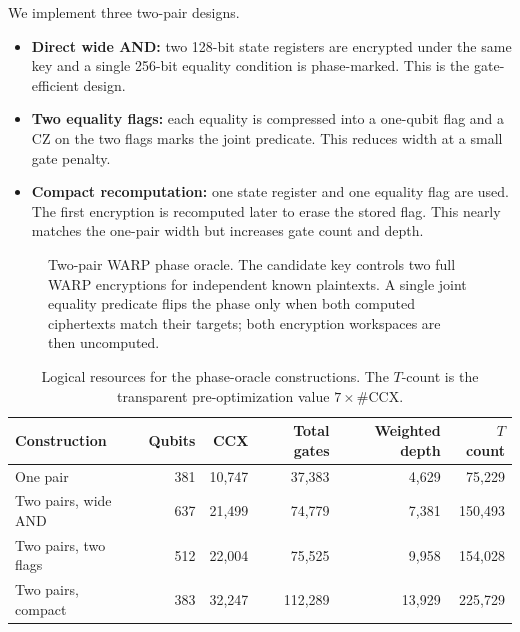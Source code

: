\documentclass[10pt,a4paper]{article}
\providecommand{\ket}[1]{\lvert #1\rangle}
\begin{document}
We implement three two-pair designs.
\begin{itemize}
    \item \textbf{Direct wide AND:} two 128-bit state registers are encrypted under the same key and a single 256-bit equality condition is phase-marked. This is the gate-efficient design.
    \item \textbf{Two equality flags:} each equality is compressed into a one-qubit flag and a CZ on the two flags marks the joint predicate. This reduces width at a small gate penalty.
    \item \textbf{Compact recomputation:} one state register and one equality flag are used. The first encryption is recomputed later to erase the stored flag. This nearly matches the one-pair width but increases gate count and depth.
\end{itemize}

\begin{figure}[tbp]
\centering
{}
\caption{Two-pair WARP phase oracle. The candidate key controls two full WARP encryptions for independent known plaintexts. A single joint equality predicate flips the phase only when both computed ciphertexts match their targets; both encryption workspaces are then uncomputed.}
\label{fig:two_pair_oracle}
\end{figure}

\begin{table}[t]
\centering
\caption{Logical resources for the phase-oracle constructions. The $T$-count is the transparent pre-optimization value $7\times\#\mathrm{CCX}$.}
\label{tab:oracle_resources}
\small
\begin{tabular}{lrrrrr}
\toprule
Construction & Qubits & CCX & Total gates & Weighted depth & $T$ count\\
\midrule
One pair & 381 & 10,747 & 37,383 & 4,629 & 75,229\\
Two pairs, wide AND & 637 & 21,499 & 74,779 & 7,381 & 150,493\\
Two pairs, two flags & 512 & 22,004 & 75,525 & 9,958 & 154,028\\
Two pairs, compact & 383 & 32,247 & 112,289 & 13,929 & 225,729\\
\bottomrule
\end{tabular}
\end{table}
\end{document}
